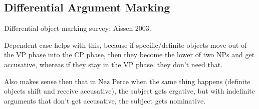 \subsection*{Differential Argument Marking}

Differential object marking survey: Aissen 2003.

Dependent case helps with this, because if specific/definite objects move out of the VP phase into the CP phase, then they become the lower of two NPs and get accusative, whereas if they stay in the VP phase, they don't need that.

Also makes sense then that in Nez Perce when the same thing happens (definite objects shift and receive accusative), the subject gets ergative, but with indefinite arguments that don't get accusative, the subject gets nominative.
